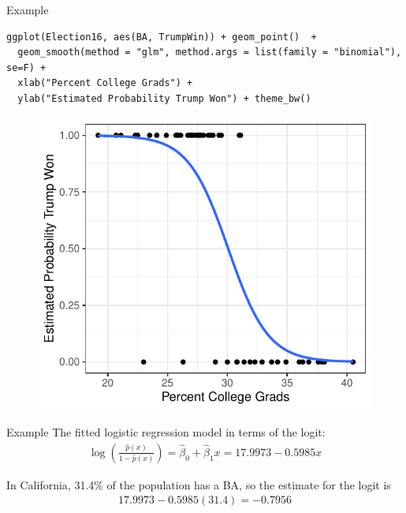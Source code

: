 \documentclass[10pt]{beamer}\usepackage[]{graphicx}\usepackage[]{color}
\begin{document}
\begin{frame}[fragile]{Example}
\scriptsize
\begin{verbatim}
ggplot(Election16, aes(BA, TrumpWin)) + geom_point()  +
  geom_smooth(method = "glm", method.args = list(family = "binomial"), se=F) +
  xlab("Percent College Grads") + 
  ylab("Estimated Probability Trump Won") + theme_bw()
\end{verbatim}
\normalsize
\begin{figure}
\includegraphics[scale=0.6]{figure/trump_logistic_plot1.pdf}
\end{figure}
\end{frame}

\begin{frame}{Example}
The fitted logistic regression model in terms of the logit:
\begin{align*}
\log\left( \frac{\hat{p}(x)}{1-\hat{p}(x)} \right) 
= \hat{\beta}_0 + \hat{\beta}_1 x
= 17.9973 - 0.5985 x
\end{align*}
\vspace{10pt}

In California, 31.4\% of the population has a BA, so the estimate for the logit is
\begin{align*}
17.9973 - 0.5985(31.4) = -0.7956
\end{align*}
\end{frame}
\end{document}
